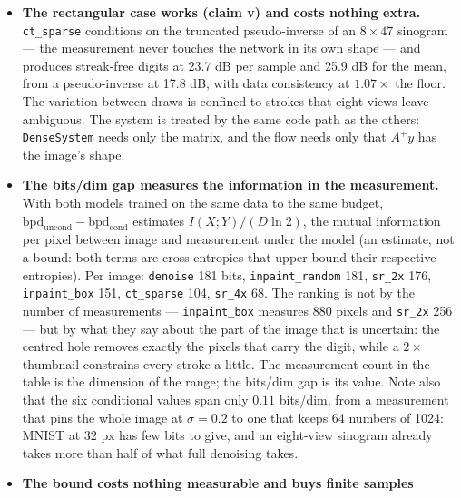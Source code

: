 \documentclass[11pt]{article}
\begin{document}
\begin{itemize}
        null dimensions it is learned to within 50\%. A hard projection
        $x \leftarrow x - A^{+}(Ax - y)$ after sampling would remove the
        residual exactly at the cost of the likelihood interpretation; it
        is not applied here so that the numbers measure the model.
  \item \textbf{The rectangular case works (claim v) and costs nothing
        extra.} \texttt{ct\_sparse} conditions on the truncated
        pseudo-inverse of an $8 \times 47$ sinogram --- the measurement
        never touches the network in its own shape --- and produces
        streak-free digits at 23.7 dB per sample and 25.9 dB for the mean,
        from a pseudo-inverse at 17.8 dB, with data consistency at
        $1.07\times$ the floor. The variation between draws is confined to
        strokes that eight views leave ambiguous. The system is treated by
        the same code path as the others: \texttt{DenseSystem} needs only
        the matrix, and the flow needs only that $A^{+}y$ has the image's
        shape.
  \item \textbf{The bits/dim gap measures the information in the
        measurement.} With both models trained on the same data to the
        same budget, $\mathrm{bpd}_{\mathrm{uncond}} -
        \mathrm{bpd}_{\mathrm{cond}}$ estimates $I(X;Y)/(D\ln 2)$, the
        mutual information per pixel between image and measurement under
        the model (an estimate, not a bound: both terms are cross-entropies
        that upper-bound their respective entropies). Per image:
        \texttt{denoise} 181 bits, \texttt{inpaint\_random} 181,
        \texttt{sr\_2x} 176, \texttt{inpaint\_box} 151, \texttt{ct\_sparse}
        104, \texttt{sr\_4x} 68. The ranking is not by the number of
        measurements --- \texttt{inpaint\_box} measures 880 pixels and
        \texttt{sr\_2x} 256 --- but by what they say about the part of the
        image that is uncertain: the centred hole removes exactly the
        pixels that carry the digit, while a $2\times$ thumbnail constrains
        every stroke a little. The measurement count in the table is the
        dimension of the range; the bits/dim gap is its value. Note also
        that the six conditional values span only $0.11$ bits/dim, from a
        measurement that pins the whole image at $\sigma = 0.2$ to one that
        keeps 64 numbers of 1024: MNIST at 32 px has few bits to give, and
        an eight-view sinogram already takes more than half of what full
        denoising takes.
  \item \textbf{The bound costs nothing measurable and buys finite samples
}
\end{itemize}
\end{document}
